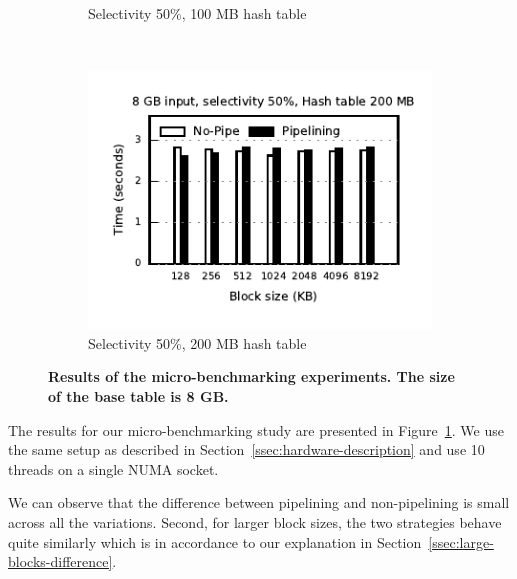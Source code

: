 \begin{figure}[t]
\begin{subfigure}[ht]{0.32\textwidth}
		\caption{Selectivity 50\%, 100 MB hash table}		
	\end{subfigure}
	~
	\begin{subfigure}[ht]{0.32\textwidth}
		\includegraphics[width=\textwidth]{pipeline/figures/microbenchmark-8gbinput-200mbht-selectivity50pc}	
		\caption{Selectivity 50\%, 200 MB hash table}
	\end{subfigure}
	\caption{\textbf{Results of the micro-benchmarking experiments. The size of the base table is 8 GB. }}
	\label{fig:microbenchmarking-results}
\end{figure}

The results for our micro-benchmarking study are presented in Figure~\ref{fig:microbenchmarking-results}. 
We use the same setup as described in Section~\ref{ssec:hardware-description} and use 10 threads on a single NUMA socket.

We can observe that the difference between pipelining and non-pipelining is small across all the variations.
Second, for larger block sizes, the two strategies behave quite similarly which is in accordance to our explanation in Section~\ref{ssec:large-blocks-difference}.